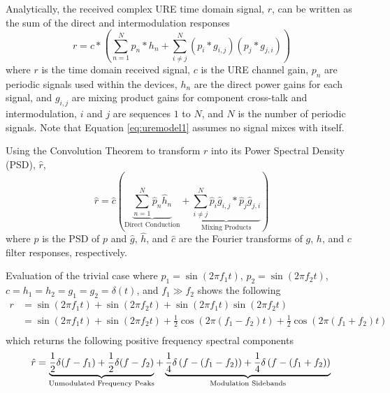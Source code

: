 Analytically, the received complex URE time domain signal, $r$, can be written as the sum of the direct and intermodulation responses
\begin{equation}
	r ={} c \ast \left(\sum^N_{n=1} p_{n} \ast h_{n} + \sum^N_{i\neq{}j} \left(p_{i} \ast g_{i,j}\right)\left(p_{j} \ast g_{j,i}\right)\right) \label{eq:uremodel1}
\end{equation}
where $r$ is the time domain received signal, $c$ is the URE channel gain, $p_{n}$ are periodic signals used within the devices, $h_{n}$ are the direct power gains for each signal, and $g_{i,j}$ are mixing product gains for component cross-talk and intermodulation, $i$ and $j$ are sequences $1$ to $N$, and $N$ is the number of periodic signals. Note that Equation \ref{eq:uremodel1} assumes no signal mixes with itself.

Using the Convolution Theorem to transform $r$ into its Power Spectral Density (PSD), $\hat{r}$,   
\begin{equation}
    \hat{r} ={} \hat{c} \left( \underbrace{\sum^{N}_{n=1} \hat{p}_{n}\hat{h}_{n}}_\text{Direct Conduction} + \underbrace{\sum^N_{i\neq{}j} \hat{p}_{i}\hat{g}_{i,j} \ast  \hat{p}_{j}\hat{g}_{j,i}}_\text{Mixing Products} \right) \label{eq:uremodel2}
\end{equation}
where $\hat{p}$ is the PSD of $p$ and $\hat{g}$, $\hat{h}$, and $\hat{c}$ are the Fourier transforms of $g$, $h$, and $c$ filter responses, respectively.

Evaluation of the trivial case where $p_1 = \sin(2\pi f_1 t)$, $p_2 = \sin(2\pi f_2 t)$, $c = h_1 = h_2 = g_1 = g_2 = \delta(t)$, and $f_1 \gg f_2$ shows the following 
\begin{equation} \label{eq:uremodelsimpletime}
\begin{split}
	r & = \sin(2\pi f_1 t) + \sin(2\pi f_2 t) + \sin(2\pi f_1 t)\sin(2\pi f_2 t) \\
		& = \sin(2\pi f_1 t) + \sin(2\pi f_2 t) + \frac{1}{2}\cos(2\pi(f_1 - f_2)t) +  \frac{1}{2}\cos(2\pi(f_1 + f_2)t)\\
\end{split}
\end{equation}
which returns the following positive frequency spectral components
\begin{equation} \label{eq:uremodelsimplefreq}
	\hat{r} = \underbrace{\frac{1}{2}\delta(f - f_1) + \frac{1}{2}\delta(f - f_2)}_\text{Unmodulated Frequency Peaks} + \underbrace{\frac{1}{4}\delta\left(f - (f_1 - f_2)\right) + \frac{1}{4}\delta\left(f - (f_1 + f_2)\right)}_\text{Modulation Sidebands}\\
\end{equation}
 
